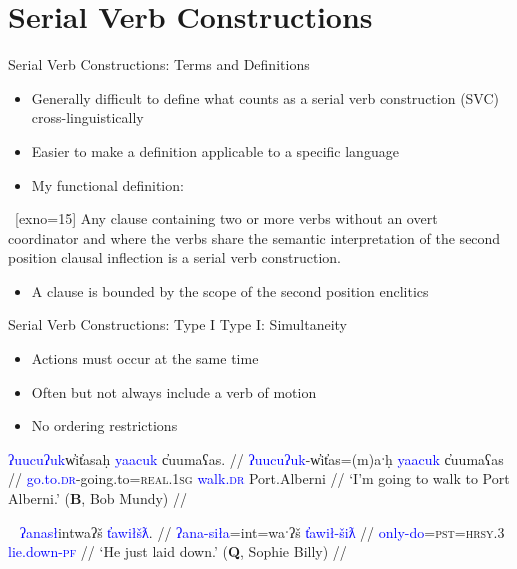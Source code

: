 \section{Serial Verb Constructions}

\begin{frame}{Serial Verb Constructions: Terms and Definitions}
\begin{itemize}
\item Generally difficult to define what counts as a serial verb construction (SVC) cross-linguistically \citep{aikhenvalddixon2006}
\item Easier to make a definition applicable to a specific language \pause
\item My functional definition:
\end{itemize}
\ex~[exno=15]
Any clause containing two or more verbs without an overt coordinator and where the verbs share the semantic interpretation of the second position clausal inflection is a serial verb construction.
\xe
\vspace{-20pt}
\begin{itemize}
\item A clause is bounded by the scope of the second position enclitics
\end{itemize}
\end{frame}

\begin{frame}{Serial Verb Constructions: Type I}
Type I: Simultaneity

\begin{itemize}
\item Actions must occur at the same time
\item Often but not always include a verb of motion
\item No ordering restrictions
\end{itemize}

\ex[exno=16]
\begingl
\glpreamble \textcolor{blue}{ʔuucuʔuk}w̓it̓asaḥ \textcolor{blue}{yaacuk} c̓uumaʕas. //
\gla \textcolor{blue}{ʔuucuʔuk}-w̓it̓as=(m)aˑḥ \textcolor{blue}{yaacuk} c̓uumaʕas //
\glb \textcolor{blue}{go.to.\textsc{dr}}-going.to=\textsc{real.1sg} \textcolor{blue}{walk.\textsc{dr}} Port.Alberni //
\glft `I'm going to walk to Port Alberni.' (\textbf{B}, Bob Mundy) //
\endgl \label{ex:walktoalberni}
\xe

\ex[exno=17]~
\begingl
\glpreamble \textcolor{blue}{ʔanasł}intwaʔš \textcolor{blue}{t̓awiłšƛ}. //
\gla \textcolor{blue}{ʔana-siła}=int=waˑʔš \textcolor{blue}{t̓awił-šiƛ} //
\glb \textcolor{blue}{only-do}=\textsc{pst}=\textsc{hrsy.3} \textcolor{blue}{lie.down-\textsc{pf}} //
\glft `He just laid down.' (\textbf{Q}, Sophie Billy) //
\endgl \label{ex:justliedown}
\xe
\end{frame}

